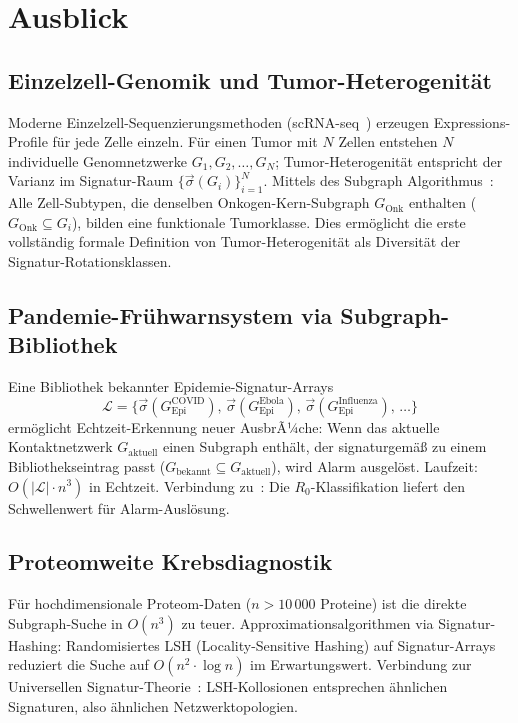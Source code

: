 ﻿\documentclass[a4paper,12pt]{article}
\theoremstyle{plain}
\theoremstyle{definition}
\theoremstyle{remark}
\newcommand{\Gepi}{G_{\mathrm{Epi}}}
\newcommand{\sigvec}{\vec{\sigma}}
\begin{document}
\section{Ausblick}

\subsection{Einzelzell-Genomik und Tumor-Heterogenit\"at}

Moderne Einzelzell-Sequenzierungsmethoden (scRNA-seq~\cite{tang2009})
erzeugen Expressions-Profile f\"ur jede Zelle einzeln.
F\"ur einen Tumor mit $N$ Zellen entstehen $N$ individuelle Genomnetzwerke
$G_1, G_2, \ldots, G_N$; Tumor-Heterogenit\"at entspricht der Varianz
im Signatur-Raum $\{\sigvec(G_i)\}_{i=1}^N$.
Mittels des Subgraph Algorithmus~\cite{epp2026subgraph}:
Alle Zell-Subtypen, die denselben Onkogen-Kern-Subgraph $G_{\mathrm{Onk}}$ enthalten
($G_{\mathrm{Onk}} \subseteq G_i$), bilden eine funktionale Tumorklasse.
Dies erm\"oglicht die erste vollst\"andig formale Definition von
Tumor-Heterogenit\"at als Diversit\"at der Signatur-Rotationsklassen.

\subsection{Pandemie-Fr\"uhwarnsystem via Subgraph-Bibliothek}

Eine Bibliothek bekannter Epidemie-Signatur-Arrays
\[
\mathcal{L} = \bigl\{\sigvec(\Gepi^{\mathrm{COVID}}),\,
\sigvec(\Gepi^{\mathrm{Ebola}}),\,
\sigvec(\Gepi^{\mathrm{Influenza}}),\, \ldots\bigr\}
\]
erm\"oglicht Echtzeit-Erkennung neuer AusbrÃ¼che:
Wenn das aktuelle Kontaktnetzwerk $G_{\mathrm{aktuell}}$ einen Subgraph
enth\"alt, der signaturgem\"a{\ss} zu einem Bibliothekseintrag passt
($G_{\mathrm{bekannt}} \subseteq G_{\mathrm{aktuell}}$), wird Alarm ausgel\"ost.
Laufzeit: $O(|\mathcal{L}| \cdot n^3)$ in Echtzeit.
Verbindung zu~\cite{epp2026r0}: Die $R_0$-Klassifikation
liefert den Schwellenwert f\"ur Alarm-Ausl\"osung.

\subsection{Proteomweite Krebsdiagnostik}

F\"ur hochdimensionale Proteom-Daten ($n > 10\,000$ Proteine) ist
die direkte Subgraph-Suche in $O(n^3)$ zu teuer.
Approximationsalgorithmen via Signatur-Hashing:
Randomisiertes LSH (Locality-Sensitive Hashing) auf Signatur-Arrays
reduziert die Suche auf $O(n^2 \cdot \log n)$ im Erwartungswert.
Verbindung zur Universellen Signatur-Theorie~\cite{epp2026ust}:
LSH-Kollosionen entsprechen \"ahnlichen Signaturen, also \"ahnlichen
Netzwerktopologien.
\end{document}

